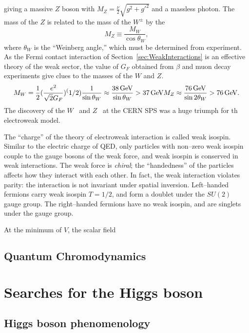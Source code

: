giving a massive $Z$ boson with $M_Z = \frac{\nu}{2}\sqrt{g^2 + g'^2}$ and a
massless photon.  The mass of the $Z$ is related to the mass of the $W^\pm$ by
the 
\begin{equation}
  M_Z \equiv \frac{M_W}{\cos \theta_W},
\end{equation}
where $\theta_W$ is the ``Weinberg angle,'' which must be determined from
experiment.  As the Fermi contact interaction of
Section~\ref{sec:WeakInteractions} is an effective theory of the weak sector,
the value of $G_F$ obtained from $\beta$ and muon decay experiments give clues
to the masses of the $W$ and $Z$.  
\begin{equation}
  M_W = \frac{1}{2}(\frac{e^2}{\sqrt 2 G_F})^(1/2)\frac{1}{\sin\theta_W} \approx
  \frac{38 \,\text{Ge\hspace{-.08em}V}}{\sin\theta_W} > 37 \,\text{Ge\hspace{-.08em}V} \\ M_Z \approx \frac{76 \,\text{Ge\hspace{-.08em}V}}{\sin
  2\theta_W} > 76\,\text{Ge\hspace{-.08em}V}.
\end{equation}
The discovery of the $W$~\cite{UA1WDiscovery,UA2WDiscovery} and
$Z$~\cite{UA1ZDiscovery, UA2ZDiscovery} at the CERN SPS was a huge triumph for
th electroweak model.

The ``charge'' of the theory of electroweak interaction is called weak isospin.
Similar to the electric charge of QED, only particles with non--zero weak
isospin couple to the gauge bosons of the weak force, and weak isospin is
conserved in weak interactions.   The weak force is \emph{chiral}; the
``handedness'' of the particles affects how they interact with each other.  In
fact, the weak interaction violates parity: the interaction is not invariant
under spatial inversion.  Left--handed fermions carry weak isospin $T = 1/2$,
and form a doublet under the $SU(2)$ gauge group.  The right--handed fermions
have no weak isospin, and are singlets under the gauge group.  

At the minimum of $V$, the scalar field

\subsection{Quantum Chromodynamics}



\section{Searches for the Higgs boson}
\subsection{Higgs boson phenomenology}
\label{sec:SMHiggsPhenom}
